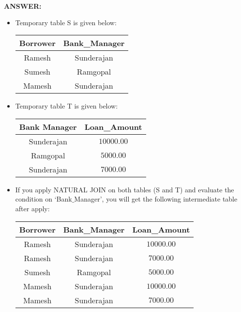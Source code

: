\documentclass[10pt]{article}
\newcommand{\lightrule}{%
	\arrayrulecolor{black!30}%
	\midrule[\lightrulewidth]%
	\arrayrulecolor{black}}
\begin{document}
\begin{enumerate}
			\color{red} \textbf{ANSWER:} \color{black} 
			\begin{itemize}
				\item Temporary table S is given below:
					\begin{center}
						\centering
						\begin{tabular}{@{} *{2}{c} @{}}
							\toprule
								\textbf{Borrower} & \textbf{Bank\_Manager} \\
							\midrule
								Ramesh & Sunderajan \\ 
							\lightrule
								Sumesh & Ramgopal \\ 
							\lightrule
								Mamesh & Sunderajan \\ 
							\bottomrule
						\end{tabular}
					\end{center}

				\item Temporary table T is given below:
					\begin{center}
						\centering
						\begin{tabular}{@{} *{2}{c} @{}}
							\toprule
								\textbf{Bank Manager} & \textbf{Loan\_Amount} \\
							\midrule
								Sunderajan & $10000.00$ \\ 
							\lightrule
								Ramgopal & $5000.00$ \\ 
							\lightrule
								Sunderajan & $7000.00$ \\ 
							\bottomrule
						\end{tabular}
					\end{center}

				\item If you apply NATURAL JOIN on both tables (S and T) and evaluate the condition on ‘Bank$\_$Manager’, you will get the following intermediate table after apply:
					\begin{center}
						\centering
						\begin{tabular}{@{} *{3}{c} @{}}
							\toprule
								\textbf{Borrower} & \textbf{Bank\_Manager} & \textbf{Loan\_Amount} \\
							\midrule
								Ramesh & Sunderajan & $10000.00$ \\ 
							\lightrule
								Ramesh & Sunderajan & $7000.00$ \\ 
							\lightrule
								Sumesh & Ramgopal & $5000.00$ \\ 
							\lightrule
								Mamesh & Sunderajan & $10000.00$ \\ 
							\lightrule
								Mamesh & Sunderajan & $7000.00$ \\ 
							\bottomrule
						\end{tabular}
					\end{center}


\end{itemize}
\end{enumerate}
\end{document}
